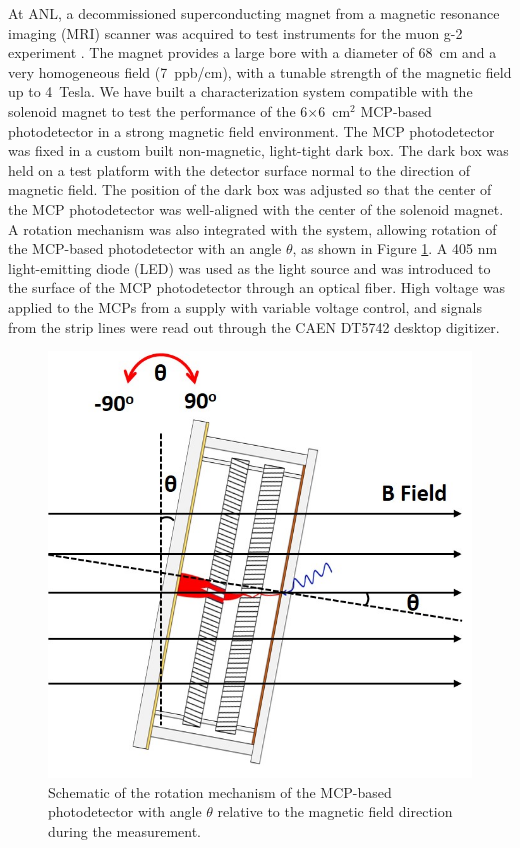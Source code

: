 \documentclass[preprint,5p]{elsarticle}
\begin{document}
At ANL, a decommissioned superconducting magnet from a magnetic resonance 
imaging (MRI) scanner was acquired to test instruments for the muon g-2 
experiment \cite{Magnet}. The magnet provides a large bore with a diameter of 
68~cm and a very homogeneous field (7~ppb/cm), with a tunable strength of the 
magnetic field up to 4~Tesla. We have built a characterization system 
compatible with the solenoid magnet to test the performance of the 
6$\times$6~cm$^2$ MCP-based photodetector in a strong magnetic field 
environment. The MCP photodetector was fixed in a custom built non-magnetic, 
light-tight dark box. The dark box was held on a test platform with the 
detector surface normal to the direction of magnetic field. The position of the 
dark box was adjusted so that the center of the MCP photodetector was 
well-aligned with the center of the solenoid magnet. A rotation mechanism was 
also integrated with the system, allowing rotation of the MCP-based 
photodetector with an angle $\theta$, as shown in Figure 
\ref{fig:MCPs_theta_rotation}. A 405 nm light-emitting diode (LED) was used as 
the light source and was introduced to the surface of the MCP photodetector 
through an optical fiber.  High voltage was applied to the MCPs from a supply 
with variable voltage control, and signals from the strip lines were read out 
through the CAEN DT5742 desktop digitizer.

\begin{figure}[tbp]
\centering 
\includegraphics[scale=0.27]{fig/MCPs_theta_rotation.png}
\caption{Schematic of the rotation mechanism of the MCP-based photodetector 
with angle $\theta$ relative to the magnetic field direction during the 
measurement.} \label{fig:MCPs_theta_rotation}
\end{figure}
\end{document}

